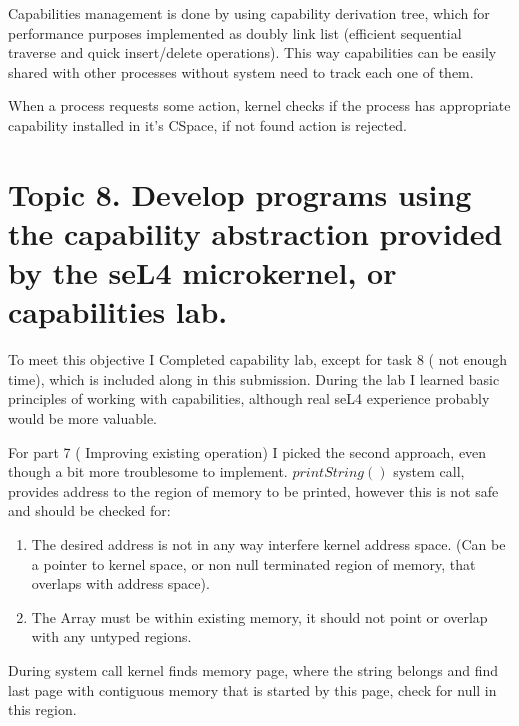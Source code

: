 \documentclass{article}
\begin{document}
        Capabilities management is done by using capability derivation tree, which for performance purposes
        implemented as doubly link list (efficient sequential traverse and quick insert/delete operations).
        This way capabilities can be easily shared with other processes without system need to track each one
        of them.

        When a process requests some action, kernel checks if the process has appropriate capability
        installed in it's CSpace, if not found action is rejected.

        \section{Topic 8. Develop programs using the capability abstraction provided by the seL4
        microkernel, or capabilities lab.}

        To meet this objective I Completed capability lab, except for task 8 ( not enough time), which is
        included along in this submission. During the lab I learned basic principles of working with
        capabilities, although real seL4 experience probably would be more valuable.

        For part 7 ( Improving existing operation) I picked the second approach, even though a bit more
        troublesome to implement. $printString()$ system call, provides address to the region of memory to be
        printed, however this is not safe and should be checked for:
        \begin{enumerate}[1.]
            \item The desired address is not in any way interfere kernel address space. (Can be  a pointer to
                kernel space, or non null terminated region of memory, that overlaps with address space).
           \item The Array must be within existing memory, it should not point or overlap with any untyped
               regions.
        \end{enumerate}

        During system call kernel finds memory page, where the string belongs and find last page with
        contiguous memory that is started by this page, check for null in this region.
\end{document}
